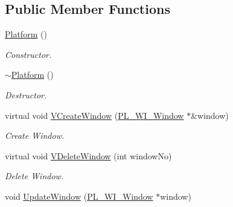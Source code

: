 \subsection*{Public Member Functions}
\begin{DoxyCompactItemize}
\item 
\hypertarget{classPlatform_1_1Platform_1_1Platform_ab3ce518df224baed0295ff22b0c34527}{
\hyperlink{classPlatform_1_1Platform_1_1Platform_ab3ce518df224baed0295ff22b0c34527}{Platform} ()}
\label{classPlatform_1_1Platform_1_1Platform_ab3ce518df224baed0295ff22b0c34527}

\begin{DoxyCompactList}\small\item\em Constructor. \item\end{DoxyCompactList}\item 
\hypertarget{classPlatform_1_1Platform_1_1Platform_a12d7f6c412b2d1191bf95dee167b7b06}{
\hyperlink{classPlatform_1_1Platform_1_1Platform_a12d7f6c412b2d1191bf95dee167b7b06}{$\sim$Platform} ()}
\label{classPlatform_1_1Platform_1_1Platform_a12d7f6c412b2d1191bf95dee167b7b06}

\begin{DoxyCompactList}\small\item\em Destructor. \item\end{DoxyCompactList}\item 
\hypertarget{classPlatform_1_1Platform_1_1Platform_a016830a5cc2fa3e6a94d3e9f325e03e3}{
virtual void \hyperlink{classPlatform_1_1Platform_1_1Platform_a016830a5cc2fa3e6a94d3e9f325e03e3}{VCreateWindow} (\hyperlink{classPlatform_1_1Window_1_1Window}{PL\_\-WI\_\-Window} $\ast$\&window)}
\label{classPlatform_1_1Platform_1_1Platform_a016830a5cc2fa3e6a94d3e9f325e03e3}

\begin{DoxyCompactList}\small\item\em Create Window. \item\end{DoxyCompactList}\item 
\hypertarget{classPlatform_1_1Platform_1_1Platform_aed8eba9dd001327dd374065de8a7bab0}{
virtual void \hyperlink{classPlatform_1_1Platform_1_1Platform_aed8eba9dd001327dd374065de8a7bab0}{VDeleteWindow} (int windowNo)}
\label{classPlatform_1_1Platform_1_1Platform_aed8eba9dd001327dd374065de8a7bab0}

\begin{DoxyCompactList}\small\item\em Delete Window. \item\end{DoxyCompactList}\item 
\hypertarget{classPlatform_1_1Platform_1_1Platform_a7f1cc19b6b23ad74c46993c12c5cb266}{
void \hyperlink{classPlatform_1_1Platform_1_1Platform_a7f1cc19b6b23ad74c46993c12c5cb266}{UpdateWindow} (\hyperlink{classPlatform_1_1Window_1_1Window}{PL\_\-WI\_\-Window} $\ast$window)}
\label{classPlatform_1_1Platform_1_1Platform_a7f1cc19b6b23ad74c46993c12c5cb266}


\end{DoxyCompactItemize}
